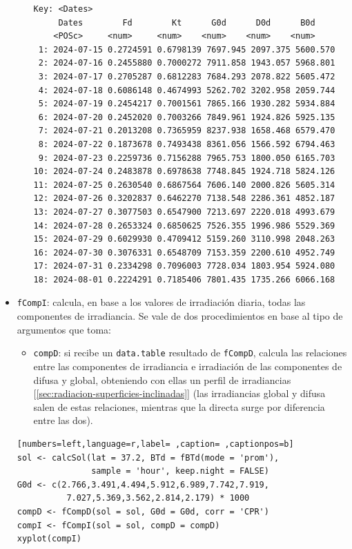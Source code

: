 \begin{itemize}
\begin{itemize}
\begin{verbatim}
Key: <Dates>
	 Dates        Fd        Kt      G0d      D0d      B0d
	<POSc>     <num>     <num>    <num>    <num>    <num>
 1: 2024-07-15 0.2724591 0.6798139 7697.945 2097.375 5600.570
 2: 2024-07-16 0.2455880 0.7000272 7911.858 1943.057 5968.801
 3: 2024-07-17 0.2705287 0.6812283 7684.293 2078.822 5605.472
 4: 2024-07-18 0.6086148 0.4674993 5262.702 3202.958 2059.744
 5: 2024-07-19 0.2454217 0.7001561 7865.166 1930.282 5934.884
 6: 2024-07-20 0.2452020 0.7003266 7849.961 1924.826 5925.135
 7: 2024-07-21 0.2013208 0.7365959 8237.938 1658.468 6579.470
 8: 2024-07-22 0.1873678 0.7493438 8361.056 1566.592 6794.463
 9: 2024-07-23 0.2259736 0.7156288 7965.753 1800.050 6165.703
10: 2024-07-24 0.2483878 0.6978638 7748.845 1924.718 5824.126
11: 2024-07-25 0.2630540 0.6867564 7606.140 2000.826 5605.314
12: 2024-07-26 0.3202837 0.6462270 7138.548 2286.361 4852.187
13: 2024-07-27 0.3077503 0.6547900 7213.697 2220.018 4993.679
14: 2024-07-28 0.2653324 0.6850625 7526.355 1996.986 5529.369
15: 2024-07-29 0.6029930 0.4709412 5159.260 3110.998 2048.263
16: 2024-07-30 0.3076331 0.6548709 7153.359 2200.610 4952.749
17: 2024-07-31 0.2334298 0.7096003 7728.034 1803.954 5924.080
18: 2024-08-01 0.2224291 0.7185406 7801.435 1735.266 6066.168
\end{verbatim}
\end{itemize}

\item \texttt{fCompI}: calcula, en base a los valores de irradiación diaria, todas las componentes de irradiancia. Se vale de dos procedimientos en base al tipo de argumentos que toma:
\begin{itemize}
\item \texttt{compD}: si recibe un \texttt{data.table} resultado de \texttt{fCompD}, calcula las relaciones entre las componentes de irradiancia e irradiación de las componentes de difusa y global, obteniendo con ellas un perfil de irradiancias [\ref{sec:radiacion-superficies-inclinadas}] (las irradiancias global y difusa salen de estas relaciones, mientras que la directa surge por diferencia entre las dos).
\end{itemize}
\begin{lstlisting}[numbers=left,language=r,label= ,caption= ,captionpos=b]
sol <- calcSol(lat = 37.2, BTd = fBTd(mode = 'prom'),
               sample = 'hour', keep.night = FALSE)
G0d <- c(2.766,3.491,4.494,5.912,6.989,7.742,7.919,
          7.027,5.369,3.562,2.814,2.179) * 1000
compD <- fCompD(sol = sol, G0d = G0d, corr = 'CPR')
compI <- fCompI(sol = sol, compD = compD)
xyplot(compI)
\end{lstlisting}


\end{itemize}
